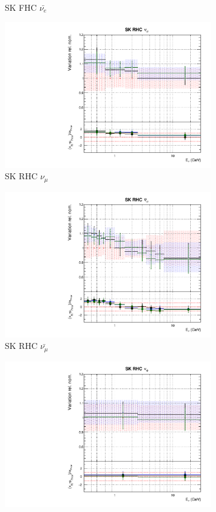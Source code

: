 \begin{figure}
\begin{subfigure}{0.45\textwidth}
  \caption{SK FHC $\bar{\nu_{e}}$}
\end{subfigure}
\begin{subfigure}{0.45\textwidth}
  \centering
  \includegraphics[width=0.75\linewidth]{figs/newolddatafitsflux_12}
  \caption{SK RHC $\nu_{\mu}$}
\end{subfigure}
\begin{subfigure}{0.45\textwidth}
  \centering
  \includegraphics[width=0.75\linewidth]{figs/newolddatafitsflux_13}
  \caption{SK RHC $\bar{\nu_{\mu}}$}
\end{subfigure}
\begin{subfigure}{0.45\textwidth}
  \centering
  \includegraphics[width=0.75\linewidth]{figs/newolddatafitsflux_14}

\end{subfigure}
\end{figure}
